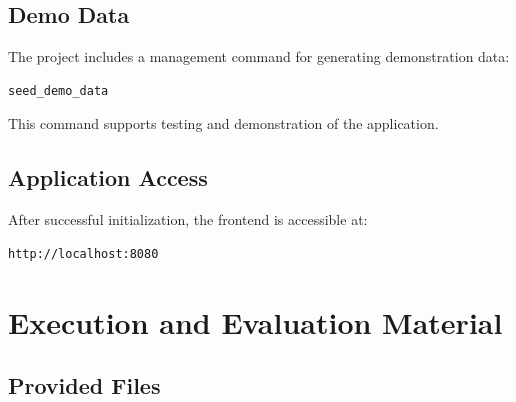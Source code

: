 \documentclass[11pt,a4paper]{article}
\begin{document}
\subsection{Demo Data}

The project includes a management command
for generating demonstration data:

\begin{lstlisting}
seed_demo_data
\end{lstlisting}

This command supports testing
and demonstration of the application.

\subsection{Application Access}

After successful initialization,
the frontend is accessible at:

\begin{lstlisting}
http://localhost:8080
\end{lstlisting}


\section{Execution and Evaluation Material}

\subsection{Provided Files}
\end{document}
